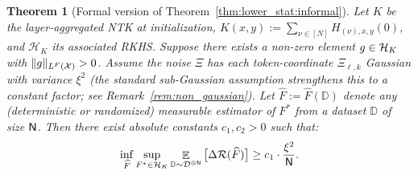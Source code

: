 \documentclass[11pt]{article}
\theoremstyle{plain}
\newtheorem{theorem}{Theorem}[section]
\newcommand{\wh}{\widehat}
\renewcommand{\hat}{\wh}
\DeclareMathOperator*{\E}{{\mathbb{E}}}
\begin{document}
\begin{theorem}[Formal version of Theorem~\ref{thm:lower_stat:informal}]\label{thm:lower_stat}
    Let $K$ be the layer-aggregated NTK at initialization, $K(x,y):=\sum_{\nu\in[N]}H_{(\nu),x,y}(0)$, and $\mathcal{H}_K$ its associated RKHS. Suppose there exists a non-zero element $g\in {\cal H}_K$ with $\|g\|_{L^F({\cal X})}>0$. Assume the noise $\Xi$ has each token-coordinate $\Xi_{\ell, k}$ Gaussian with variance $\xi^2$ (the standard sub-Gaussian assumption strengthens this to a constant factor; see Remark~\ref{rem:non_gaussian}). Let $\hat F := \hat F(\mathbb{D})$ denote any (deterministic or randomized) measurable estimator of $F^*$ from a dataset $\mathbb{D}$ of size $\sf N$. Then there exist absolute constants $c_1, c_2>0$ such that:
    \begin{align*}
        \inf_{\hat F} \sup_{F^*\in {\cal H}_K} \E_{\mathbb{D}\sim {\cal D}^{\otimes {\sf N}}}\big[\Delta{\cal R}(\hat F)\big] \ge c_1 \cdot \frac{\xi^2}{{\sf N}}.
    \end{align*}
\end{theorem}
\end{document}
